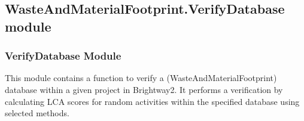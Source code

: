 \documentclass[letterpaper,10pt,english]{sphinxmanual}
\begin{document}
\subsection{WasteAndMaterialFootprint.VerifyDatabase module}
\label{\detokenize{WasteAndMaterialFootprint:module-WasteAndMaterialFootprint.VerifyDatabase}}\label{\detokenize{WasteAndMaterialFootprint:wasteandmaterialfootprint-verifydatabase-module}}

\subsubsection{VerifyDatabase Module}
\label{\detokenize{WasteAndMaterialFootprint:verifydatabase-module}}
\sphinxAtStartPar
This module contains a function to verify a (WasteAndMaterialFootprint) database 
within a given project in Brightway2. It performs a verification by calculating LCA scores 
for random activities within the specified database using selected methods.
\end{document}
